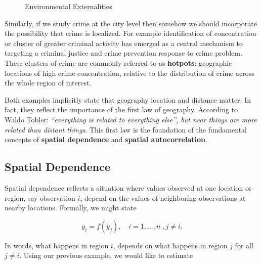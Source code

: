 \documentclass[english,12pt]{book}\usepackage[]{graphicx}\usepackage[]{xcolor}
\begin{document}
\begin{figure}[h]
\caption{Environmental Externalities}
\label{fig:example_poll}
\centering
{}
\end{figure}

Similarly, if we study crime at the city level then somehow we should incorporate the possibility that crime is localized. For example identification of concentration or cluster of greater criminal activity has emerged as a central mechanism to targeting a criminal justice and crime prevention response to crime problem. These clusters of crime are commonly referred to as \textbf{hotpots}: geographic locations of high crime concentration, relative to the distribution of crime across the whole region of interest. 

Both examples implicitly state that geography location and distance matter. In fact, they reflect the importance of the first law of geography. According to Waldo Tobler: \emph{``everything is related to everything else'', but near things are more related than distant things}. This first law is the foundation of the fundamental concepts of \textbf{spatial dependence} and \textbf{spatial autocorrelation}.

\subsection{Spatial Dependence}\label{sec:spatial_dependence}

Spatial dependence reflects a situation where values observed at one location or region, say observation $i$, depend on the values of neighboring observations at nearby locations. Formally, we might state

\begin{equation*}
  y_i = f(y_j),\quad i = 1,...,n\;, j\neq i.
\end{equation*}

In words, what happens in region $i$, depends on what happens in region $j$ for all $j\neq i$. Using our previous example, we would like to estimate 
\end{document}

